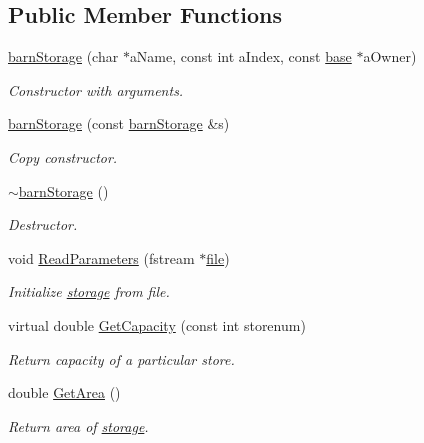 \subsection*{Public Member Functions}
\begin{DoxyCompactItemize}
\item 
\hyperlink{classbarn_storage_afa9fc669647e848edbb6d32475be7a22}{barnStorage} (char $\ast$aName, const int aIndex, const \hyperlink{classbase}{base} $\ast$aOwner)
\begin{DoxyCompactList}\small\item\em Constructor with arguments. \item\end{DoxyCompactList}\item 
\hyperlink{classbarn_storage_ae77c49e50fc296f74857e4dd5a127e6e}{barnStorage} (const \hyperlink{classbarn_storage}{barnStorage} \&s)
\begin{DoxyCompactList}\small\item\em Copy constructor. \item\end{DoxyCompactList}\item 
\hyperlink{classbarn_storage_a62d94a9580e2fdfcd040e9262fb683ba}{$\sim$barnStorage} ()
\begin{DoxyCompactList}\small\item\em Destructor. \item\end{DoxyCompactList}\item 
void \hyperlink{classbarn_storage_a04a2ab71aceafb10d6f4a51ed59960e5}{ReadParameters} (fstream $\ast$\hyperlink{classbase_a3af52ee9891719d09b8b19b42450b6f6}{file})
\begin{DoxyCompactList}\small\item\em Initialize \hyperlink{classstorage}{storage} from file. \item\end{DoxyCompactList}\item 
virtual double \hyperlink{classbarn_storage_a7e11082a34b3ffdaad4426e926355e4a}{GetCapacity} (const int storenum)
\begin{DoxyCompactList}\small\item\em Return capacity of a particular store. \item\end{DoxyCompactList}\item 
double \hyperlink{classbarn_storage_a727f13788856da203570834247a7b475}{GetArea} ()
\begin{DoxyCompactList}\small\item\em Return area of \hyperlink{classstorage}{storage}. \item\end{DoxyCompactList}\item 

\end{DoxyCompactItemize}
